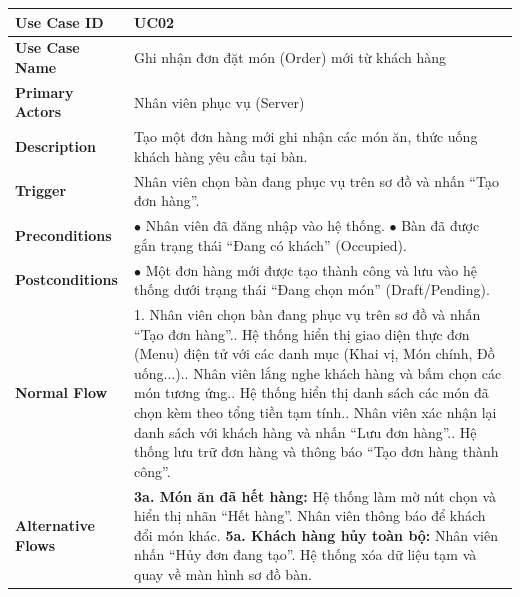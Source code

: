 \documentclass[12pt,a4paper]{article}
\begin{document}
\begin{longtable}{|L{3.5cm}|L{12.5cm}|}
\hline
\textbf{Use Case ID} & UC02 \\ \hline
\textbf{Use Case Name} & Ghi nhận đơn đặt món (Order) mới từ khách hàng \\ \hline
\textbf{Primary Actors} & Nhân viên phục vụ (Server) \\ \hline
\textbf{Description} & Tạo một đơn hàng mới ghi nhận các món ăn, thức uống khách hàng yêu cầu tại bàn. \\ \hline
\textbf{Trigger} & Nhân viên chọn bàn đang phục vụ trên sơ đồ và nhấn ``Tạo đơn hàng''. \\ \hline
\textbf{Preconditions} &
$\bullet$ Nhân viên đã đăng nhập vào hệ thống.\newline
$\bullet$ Bàn đã được gắn trạng thái ``Đang có khách'' (Occupied). \\ \hline
\textbf{Postconditions} & $\bullet$ Một đơn hàng mới được tạo thành công và lưu vào hệ thống dưới trạng thái ``Đang chọn món'' (Draft/Pending). \\ \hline
\textbf{Normal Flow} &
1. Nhân viên chọn bàn đang phục vụ trên sơ đồ và nhấn ``Tạo đơn hàng''.. Hệ thống hiển thị giao diện thực đơn (Menu) điện tử với các danh mục (Khai vị, Món chính, Đồ uống...).. Nhân viên lắng nghe khách hàng và bấm chọn các món tương ứng.. Hệ thống hiển thị danh sách các món đã chọn kèm theo tổng tiền tạm tính.. Nhân viên xác nhận lại danh sách với khách hàng và nhấn ``Lưu đơn hàng''.. Hệ thống lưu trữ đơn hàng và thông báo ``Tạo đơn hàng thành công''. \\ \hline
\textbf{Alternative Flows} &
\textbf{3a. Món ăn đã hết hàng:} Hệ thống làm mờ nút chọn và hiển thị nhãn ``Hết hàng''. Nhân viên thông báo để khách đổi món khác.\newline
\textbf{5a. Khách hàng hủy toàn bộ:} Nhân viên nhấn ``Hủy đơn đang tạo''. Hệ thống xóa dữ liệu tạm và quay về màn hình sơ đồ bàn. \\ \hline
\end{longtable}
\end{document}
